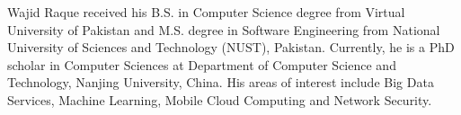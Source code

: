 \documentclass[10pt,journal,compsoc]{IEEEtran}
\begin{document}
\begin{IEEEbiography}{Wajid Raque} 
received his B.S. in Computer Science degree from Virtual University of Pakistan and M.S. degree in Software Engineering from National University of Sciences and Technology (NUST), Pakistan. Currently, he is a PhD scholar in Computer Sciences at Department of Computer Science and Technology, Nanjing University, China. His areas of interest include Big Data Services, Machine Learning, Mobile Cloud Computing and Network Security.
\end{IEEEbiography}
\end{document}
